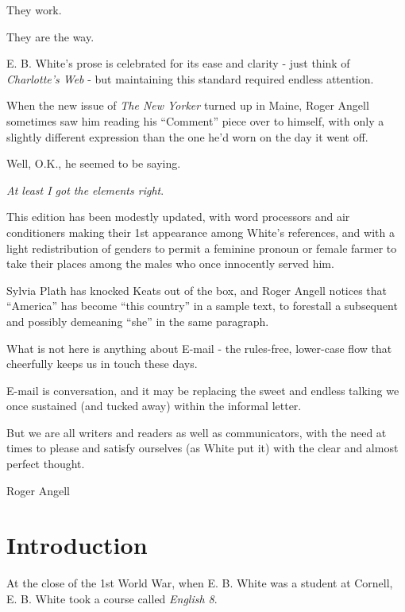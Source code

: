 \documentclass{book}
\numberwithin{equation}{section}
\begin{document}
They work.

They are the way.

%
E. B. White's prose is celebrated for its ease and clarity - just think of \textit{Charlotte's Web} - but maintaining this standard required endless attention.

When the new issue of \textit{The New Yorker} turned up in Maine, Roger Angell sometimes saw him reading his ``Comment'' piece over to himself, with only a slightly different expression than the one he'd worn on the day it went off.

Well, O.K., he seemed to be saying.

\textit{At least I got the elements right}.

%
This edition has been modestly updated, with word processors and air conditioners making their 1st appearance among White's references, and with a light redistribution of genders to permit a feminine pronoun or female farmer to take their places among the males who once innocently served him.

Sylvia Plath has knocked Keats out of the box, and Roger Angell notices that ``America'' has become ``this country'' in a sample text, to forestall a subsequent and possibly demeaning ``she'' in the same paragraph.

What is not here is anything about E-mail - the rules-free, lower-case flow that cheerfully keeps us in touch these days.

E-mail is conversation, and it may be replacing the sweet and endless talking we once sustained (and tucked away) within the informal letter.

But we are all writers and readers as well as communicators, with the need at times to please and satisfy ourselves (as White put it) with the clear and almost perfect thought.

\begin{flushright}
    Roger Angell
\end{flushright}


\chapter*{Introduction}

At the close of the 1st World War, when E. B. White was a student at Cornell, E. B. White took a course called \textit{English 8}.
\end{document}

